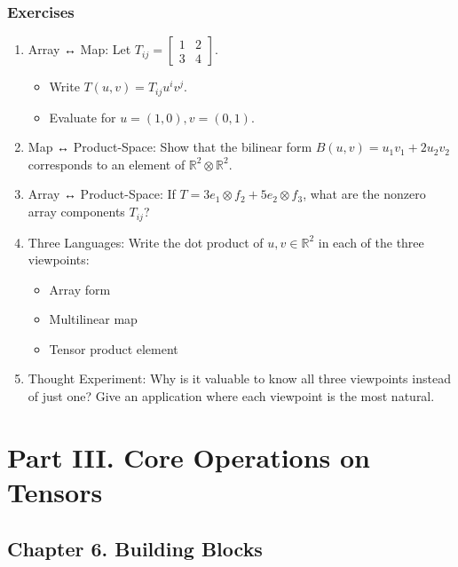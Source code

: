 \documentclass[
  letterpaper,
  DIV=11,
  numbers=noendperiod]{scrreprt}
\providecommand{\tightlist}{%
  \setlength{\itemsep}{0pt}\setlength{\parskip}{0pt}}
\begin{document}
\subsection{Exercises}\label{exercises-19}

\begin{enumerate}
\def\labelenumi{\arabic{enumi}.}
\item
  Array ↔ Map: Let
  \(T_{ij} = \begin{bmatrix}1 & 2 \\ 3 & 4\end{bmatrix}\).

  \begin{itemize}
  \tightlist
  \item
    Write \(T(u,v) = T_{ij} u^i v^j\).
  \item
    Evaluate for \(u=(1,0), v=(0,1)\).
  \end{itemize}
\item
  Map ↔ Product-Space: Show that the bilinear form
  \(B(u,v) = u_1v_1 + 2u_2v_2\) corresponds to an element of
  \(\mathbb{R}^2 \otimes \mathbb{R}^2\).
\item
  Array ↔ Product-Space: If
  \(T = 3 e_1 \otimes f_2 + 5 e_2 \otimes f_3\), what are the nonzero
  array components \(T_{ij}\)?
\item
  Three Languages: Write the dot product of \(u,v \in \mathbb{R}^2\) in
  each of the three viewpoints:

  \begin{itemize}
  \tightlist
  \item
    Array form
  \item
    Multilinear map
  \item
    Tensor product element
  \end{itemize}
\item
  Thought Experiment: Why is it valuable to know all three viewpoints
  instead of just one? Give an application where each viewpoint is the
  most natural.
\end{enumerate}


\chapter{Part III. Core Operations on
Tensors}\label{part-iii.-core-operations-on-tensors}

\section{Chapter 6. Building Blocks}\label{chapter-6.-building-blocks}
\end{document}
